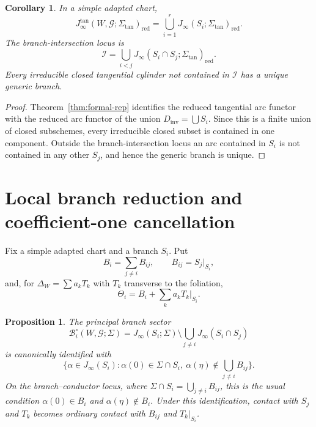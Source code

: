 \documentclass[11pt]{amsart}
\numberwithin{equation}{section}
\theoremstyle{plain}
\newtheorem{Proposition}[Theorem]{Proposition}
\newtheorem{Corollary}[Theorem]{Corollary}
\theoremstyle{definition}
\newcommand{\Sigmatan}{\Sigma_{\mathrm{tan}}}
\newcommand{\red}{\mathrm{red}}
\newcommand{\Dinv}{D_{\mathrm{inv}}}
\newcommand{\cG}{\mathcal G}
\newcommand{\cB}{\mathcal B}
\begin{document}
\begin{Corollary}
\label{cor:branch-decomp}
In a simple adapted chart,
\[
J_\infty^{\tan}(W,\cG;\Sigmatan)_{\red}=\bigcup_{i=1}^r J_\infty(S_i;\Sigmatan)_{\red}.
\]
The branch-intersection locus is
\[
\mathcal I=\bigcup_{i<j}J_\infty(S_i\cap S_j;\Sigmatan)_{\red}.
\]
Every irreducible closed tangential cylinder not contained in $\mathcal I$ has a unique generic branch.
\end{Corollary}

\begin{proof}
Theorem~\ref{thm:formal-rep} identifies the reduced tangential arc functor with the reduced arc functor of the union $\Dinv=\bigcup S_i$.  Since this is a finite union of closed subschemes, every irreducible closed subset is contained in one component.  Outside the branch-intersection locus an arc contained in $S_i$ is not contained in any other $S_j$, and hence the generic branch is unique.
\end{proof}

\section{Local branch reduction and coefficient-one cancellation}
\label{sec:branch-local}

Fix a simple adapted chart and a branch $S_i$.  Put
\[
B_i=\sum_{j\ne i}B_{ij}, \qquad B_{ij}=S_j|_{S_i},
\]
and, for $\Delta_W=\sum a_kT_k$ with $T_k$ transverse to the foliation,
\[
\Theta_i=B_i+\sum_k a_kT_k|_{S_i}.
\]

\begin{Proposition}
\label{prop:branch-id}
The principal branch sector
\[
\cB_i^\circ(W,\cG;\Sigma)=J_\infty(S_i;\Sigma)\setminus \bigcup_{j\ne i}J_\infty(S_i\cap S_j)
\]
is canonically identified with
\[
\{\alpha\in J_\infty(S_i):\alpha(0)\in \Sigma\cap S_i,\ \alpha(\eta)\notin \bigcup_{j\ne i}B_{ij}\}.
\]
On the branch--conductor locus, where $\Sigma\cap S_i=\bigcup_{j\ne i}B_{ij}$, this is the usual condition $\alpha(0)\in B_i$ and $\alpha(\eta)\notin B_i$.
Under this identification, contact with $S_j$ and $T_k$ becomes ordinary contact with $B_{ij}$ and $T_k|_{S_i}$.
\end{Proposition}
\end{document}
